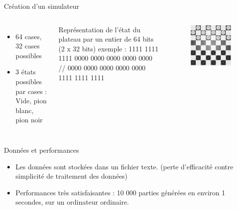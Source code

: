 \documentclass{beamer}
\begin{document}
\begin{frame}{Création d'un simulateur}
    \begin{columns}
        \begin{itemize}
            \item 64 cases, 32 cases possibles
            \item 3 états possibles par cases : \newline
                  Vide, pion blanc, pion noir
        \end{itemize}
        Représentation de l'état du plateau par un entier de 64 bits (\alert{2 x 32 bits})
        exemple : 1111 1111 1111 0000 0000 0000 0000 0000 // 0000 0000 0000 0000 0000 1111 1111 1111

        \begin{figure}
            \centering
            \includegraphics[width=\columnwidth]{im/dames2.png}
        \end{figure}
    \end{columns}
\end{frame}

\begin{frame}{Données et performances}
    \begin{itemize}
        \item Les données sont stockées dans un fichier texte. \newline
              (perte d'efficacité contre simplicité de traitement des données)
        \item Performances très satisfaisantes : \newline
              \alert{10 000} parties générées en environ \alert{1 secondes}, sur un ordinateur ordinaire.
    \end{itemize}
\end{frame}
\end{document}
